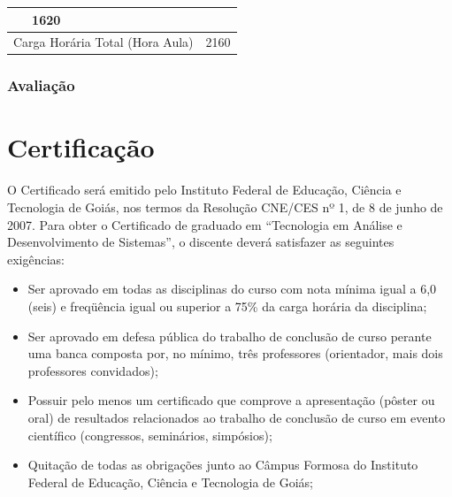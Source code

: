 \documentclass[11pt,fleqn]{book} %
\begin{document}
\begin{table}[]
{\begin{tabular}{|l|l|c|c|c|c|c|c|c|}
			& 1620                 \\ \hline
			\multicolumn{8}{|l|}{Carga Horária Total (Hora Aula)}                                                                                                                                                                                        
			& 2160                 \\ \hline
		\end{tabular}%
	}
\end{table}


\subsubsection{Avaliação}


\section{Certificação}

O Certificado será emitido pelo Instituto Federal de Educação, Ciência e Tecnologia de Goiás, nos termos da Resolução CNE/CES nº 1, de 8 de junho de 2007.	
Para obter o Certificado de graduado em ``Tecnologia em Análise e Desenvolvimento de Sistemas'', o discente deverá satisfazer as seguintes exigências:
\begin{itemize}
	\item Ser aprovado em todas as disciplinas do curso com nota mínima igual a 6,0 (seis) e freqüência igual ou superior a 75\% da carga horária da disciplina;
	\item Ser aprovado em defesa pública do trabalho de conclusão de curso perante uma banca composta por, no mínimo, três professores (orientador, mais dois professores convidados);
	\item Possuir pelo menos um certificado que comprove a apresentação (pôster ou oral) de resultados relacionados ao trabalho de conclusão de curso em evento científico (congressos, seminários, simpósios);
	\item Quitação de todas as obrigações junto ao Câmpus Formosa do Instituto Federal de Educação, Ciência e Tecnologia de Goiás;
\end{itemize}

\end{document}
